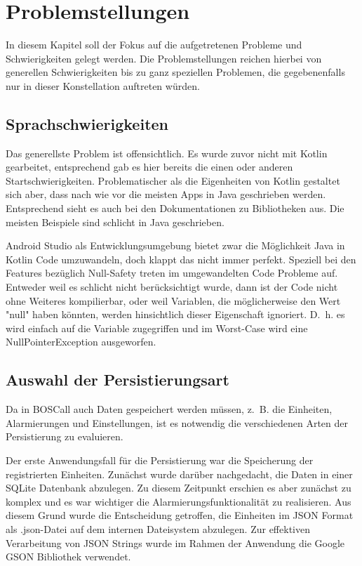 \section{Problemstellungen}
\label{sec:problemstellungen}
In diesem Kapitel soll der Fokus auf die aufgetretenen Probleme und Schwierigkeiten gelegt werden. Die Problemstellungen reichen hierbei von generellen Schwierigkeiten bis zu ganz speziellen Problemen, die gegebenenfalls nur in dieser Konstellation auftreten würden.

\subsection{Sprachschwierigkeiten}
Das generellste Problem ist offensichtlich. Es wurde zuvor nicht mit Kotlin gearbeitet, entsprechend gab es hier bereits die einen oder anderen Startschwierigkeiten. Problematischer als die Eigenheiten von Kotlin gestaltet sich aber, dass nach wie vor die meisten Apps in Java geschrieben werden. Entsprechend sieht es auch bei den Dokumentationen zu Bibliotheken aus. Die meisten Beispiele sind schlicht in Java geschrieben.

Android Studio als Entwicklungsumgebung bietet zwar die Möglichkeit Java in Kotlin Code umzuwandeln, doch klappt das nicht immer perfekt. Speziell bei den Features bezüglich Null-Safety treten im umgewandelten Code Probleme auf. Entweder weil es schlicht nicht berücksichtigt wurde, dann ist der Code nicht ohne Weiteres kompilierbar, oder weil Variablen, die möglicherweise den Wert "null" haben könnten, werden hinsichtlich dieser Eigenschaft ignoriert. D.~h. es wird einfach auf die Variable zugegriffen und im Worst-Case wird eine NullPointerException ausgeworfen.

\subsection{Auswahl der Persistierungsart}
Da in BOSCall auch Daten gespeichert werden müssen, z.~B. die Einheiten, Alarmierungen und Einstellungen, ist es notwendig die verschiedenen Arten der Persistierung zu evaluieren.

Der erste Anwendungsfall für die Persistierung war die Speicherung der registrierten Einheiten. Zunächst wurde darüber nachgedacht, die Daten in einer SQLite Datenbank abzulegen. Zu diesem Zeitpunkt erschien es aber zunächst zu komplex und es war wichtiger die Alarmierungsfunktionalität zu realisieren. Aus diesem Grund wurde die Entscheidung getroffen, die Einheiten im JSON Format als .json-Datei auf dem internen Dateisystem abzulegen. Zur effektiven Verarbeitung von JSON Strings wurde im Rahmen der Anwendung die Google GSON Bibliothek\cite{Github:GSON} verwendet.

